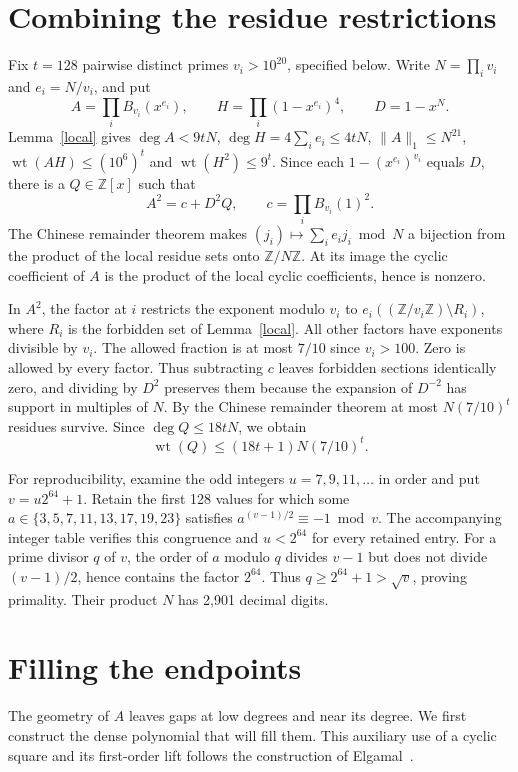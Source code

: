 \documentclass[10pt,a4paper,reqno]{amsart}
\newcommand{\wt}{\operatorname{wt}}
\newcommand{\ZZ}{\mathbb Z}
\begin{document}
\section{Combining the residue restrictions}\label{sec:crt}
Fix $t=128$ pairwise distinct primes $v_i>10^{20}$, specified below. Write $N=\prod_i v_i$ and $e_i=N/v_i$, and put
\[
 A=\prod_i B_{v_i}(x^{e_i}),\qquad H=\prod_i(1-x^{e_i})^4,\qquad D=1-x^N .
\]
Lemma~\ref{local} gives $\deg A<9tN$, $\deg H=4\sum_i e_i\le4tN$, $\|A\|_1\le N^{21}$, $\wt(AH)\le(10^6)^t$ and $\wt(H^2)\le9^t$. Since each $1-(x^{e_i})^{v_i}$ equals $D$, there is a $Q\in\ZZ[x]$ such that
\begin{equation}\label{identity}
                 A^2=c+D^2Q,\qquad c=\prod_i B_{v_i}(1)^2.
\end{equation}
The Chinese remainder theorem makes $(j_i)\mapsto\sum_i e_i j_i\bmod N$ a bijection from the product of the local residue sets onto $\ZZ/N\ZZ$. At its image the cyclic coefficient of $A$ is the product of the local cyclic coefficients, hence is nonzero.

In $A^2$, the factor at $i$ restricts the exponent modulo $v_i$ to $e_i((\ZZ/v_i\ZZ)\setminus R_i)$, where $R_i$ is the forbidden set of Lemma~\ref{local}. All other factors have exponents divisible by $v_i$. The allowed fraction is at most $7/10$ since $v_i>100$. Zero is allowed by every factor. Thus subtracting $c$ leaves forbidden sections identically zero, and dividing by $D^2$ preserves them because the expansion of $D^{-2}$ has support in multiples of $N$. By the Chinese remainder theorem at most $N(7/10)^t$ residues survive. Since $\deg Q\le18tN$, we obtain
\begin{equation}\label{qbound}
                         \wt(Q)\le(18t+1)N(7/10)^t .
\end{equation}

For reproducibility, examine the odd integers $u=7,9,11,\dots$ in order and put $v=u2^{64}+1$. Retain the first 128 values for which some $a\in\{3,5,7,11,13,17,19,23\}$ satisfies $a^{(v-1)/2}\equiv-1\bmod v$. The accompanying integer table verifies this congruence and $u<2^{64}$ for every retained entry. For a prime divisor $q$ of $v$, the order of $a$ modulo $q$ divides $v-1$ but does not divide $(v-1)/2$, hence contains the factor $2^{64}$. Thus $q\ge2^{64}+1>\sqrt v$, proving primality. Their product $N$ has 2,901 decimal digits.

\section{Filling the endpoints}\label{sec:end}
The geometry of $A$ leaves gaps at low degrees and near its degree. We first construct the dense polynomial that will fill them. This auxiliary use of a cyclic square and its first-order lift follows the construction of Elgamal~\cite{elgamal}.
\end{document}
